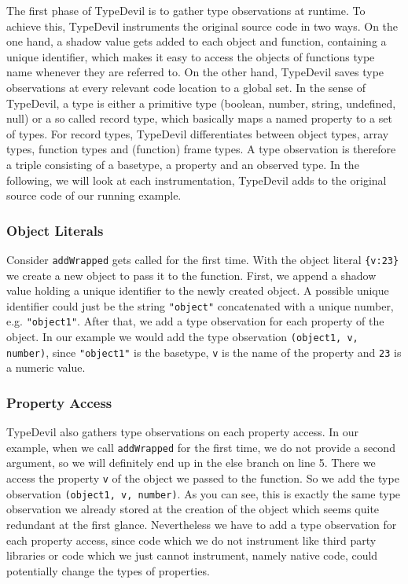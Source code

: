\documentclass[runningheads,a4paper]{llncs}
\begin{document}
The first phase of TypeDevil is to gather type observations at runtime.
To achieve this, TypeDevil instruments the original source code in two ways.
On the one hand, a shadow value gets added to each object and function, containing a unique identifier, which makes it easy to access the objects of functions type name whenever they are referred to. 
On the other hand, TypeDevil saves type observations at every relevant code location to a global set.
In the sense of TypeDevil, a type is either a primitive type (boolean, number, string, undefined, null) or a so called record type, which basically maps a named property to a set of types.
For record types, TypeDevil differentiates between object types, array types, function types and (function) frame types.
A type observation is therefore a triple consisting of a basetype, a property and an observed type.
In the following, we will look at each instrumentation, TypeDevil adds to the original source code of our running example.

\subsubsection{Object Literals}
Consider \lstinline[columns=fixed]{addWrapped} gets called for the first time.
With the object literal \lstinline[columns=fixed]!{v:23}! we create a new object to pass it to the function.
First, we append a shadow value holding a unique identifier to the newly created object. A possible unique identifier could just be the string \lstinline[columns=fixed]{"object"} concatenated with a unique number, e.g. \lstinline[columns=fixed]{"object1"}.
After that, we add a type observation for each property of the object.
In our example we would add the type observation \lstinline[columns=fixed]{(object1, v, number)}, since \lstinline[columns=fixed]{"object1"} is the basetype, \lstinline[columns=fixed]{v} is the name of the property and \lstinline[columns=fixed]{23} is a numeric value.

\subsubsection{Property Access}
TypeDevil also gathers type observations on each property access.
In our example, when we call \lstinline[columns=fixed]{addWrapped} for the first time, we do not provide a second argument, so we will definitely end up in the else branch on line 5. 
There we access the property \lstinline[columns=fixed]{v} of the object we passed to the function.
So we add the type observation \lstinline[columns=fixed]{(object1, v, number)}.
As you can see, this is exactly the same type observation we already stored at the creation of the object which seems quite redundant at the first glance. 
Nevertheless we have to add a type observation for each property access, since code which we do not instrument like third party libraries or code which we just cannot instrument, namely native code, could potentially change the types of properties.
\end{document}
